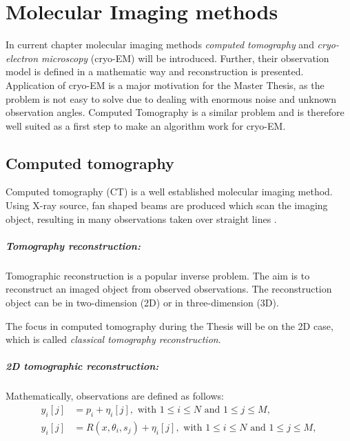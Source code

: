 \chapter{Molecular Imaging methods}
\label{sec:imaging}

In current chapter molecular imaging methods \textit{computed tomography} and 
\textit{cryo-electron microscopy} (cryo-EM) will be introduced. 
Further, their observation model is defined in a mathematic way and reconstruction is presented.
Application of cryo-EM is a major motivation for the Master Thesis, 
as the problem is not easy to solve due to dealing with enormous noise and unknown observation angles.
Computed Tomography is a similar problem and is therefore well suited as a
first step to make an algorithm work for cryo-EM. 


\section{Computed tomography}
Computed tomography (CT) is a well established molecular imaging method.
Using X-ray source, fan shaped beams are produced which scan the imaging object,
resulting in many observations taken over straight lines \cite{computedTomography}.

\paragraph{Tomography reconstruction:}
Tomographic reconstruction \cite{tomographicReconstruction} is a popular inverse problem. 
The aim is to reconstruct an imaged object from observed observations.
The reconstruction object can be in two-dimension (2D) or in three-dimension (3D). 

\begin{tcolorbox}[colback=red!5!white,colframe=red!75!black]
    The focus in computed tomography during the Thesis will be on the 2D case, which is called \textit{classical tomography reconstruction}.
\end{tcolorbox}

\pagebreak

\paragraph{2D tomographic reconstruction:}

Mathematically, observations are defined as follows:
\begin{equation}
    \label{eq:2Dreconstruction}
    \begin{aligned}
        y_i[j] &= p_i + \eta_i[j] , \text{ with } 1 \leq i \leq N \text{ and } 1 \leq j \leq M, \\
        y_i[j] &= R(x, \theta_i, s_j) + \eta_i[j] , \text{ with } 1 \leq i \leq N \text{ and } 1 \leq j \leq M,
    \end{aligned}
\end{equation}

